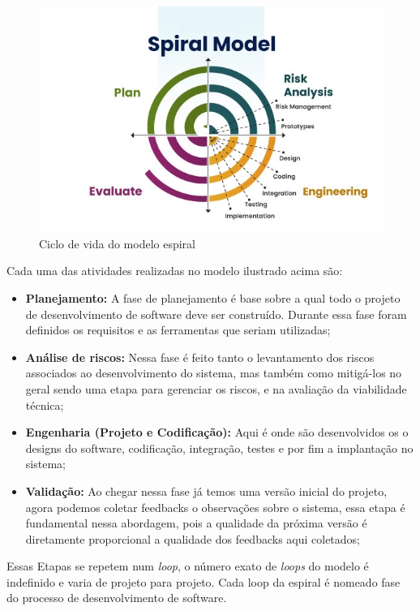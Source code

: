 \newpage
\begin{figure}
    \centering
    \includegraphics[width=0.9\linewidth]{figuras/spiral-model.jpg}
    \caption{Ciclo de vida do modelo espiral}
    \label{spiral-model}
\end{figure}
Cada uma das atividades realizadas no modelo ilustrado acima são:
\begin{itemize}
    \item \textbf{Planejamento:} A fase de planejamento é base sobre a qual todo o projeto de desenvolvimento de software deve ser construído. Durante essa fase foram definidos os requisitos e as ferramentas que seriam utilizadas;
    \item \textbf{Análise de riscos:} Nessa fase é feito tanto o levantamento dos riscos associados ao desenvolvimento do sistema, mas também como mitigá-los no geral sendo uma etapa para gerenciar os riscos, e na avaliação da viabilidade técnica;
    \item \textbf{Engenharia (Projeto e Codificação):} Aqui é onde são desenvolvidos os o designs do software, codificação, integração, testes e por fim a implantação no sistema;
    \item \textbf{Validação:} Ao chegar nessa fase já temos uma versão inicial do projeto, agora podemos coletar feedbacks o observações sobre o sistema, essa etapa é fundamental nessa abordagem, pois a qualidade da próxima versão é diretamente proporcional a qualidade dos feedbacks aqui coletados;
\end{itemize}

Essas Etapas se repetem num \textit{loop}, o número exato de \textit{loops} do modelo é indefinido e varia de projeto para projeto. Cada loop da espiral é nomeado fase do processo de desenvolvimento de software.

